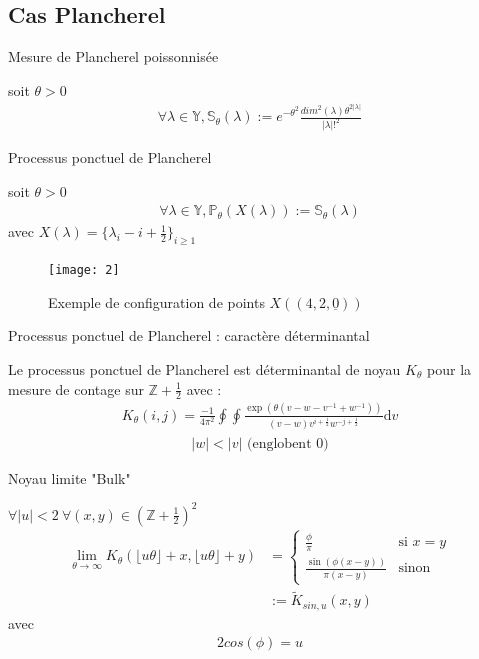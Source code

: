 \documentclass[french]{beamer}
\begin{document}
\subsection{Cas Plancherel}
\begin{frame}{Mesure de Plancherel poissonnisée }
\begin{definition}
soit $\theta>0$
\begin{align*}
\forall \lambda \in \mathbb{Y},  \mathbb{S}_\theta(\lambda):=e^{-\theta^2}\frac{dim^2(\lambda)\theta^{2|\lambda|}}{|\lambda|!^2}
\end{align*}
\end{definition}
\end{frame}
\begin{frame}{Processus ponctuel de Plancherel}

\begin{definition}
soit $\theta>0$
\begin{align*}
\forall \lambda \in \mathbb{Y},  \mathbb{P}_\theta(X(\lambda)):= \mathbb{S}_\theta(\lambda)
\end{align*}
avec $X(\lambda)=\{\lambda_i-i+\frac{1}{2}\}_{i\geq 1}$

\end{definition}
\begin{figure}[ht]
    \centering
  \texttt{[image: 2]}
\caption {Exemple de configuration de points  $X((4,2,\underline{0}))$}
\end{figure}
\end{frame}
\begin{frame}{Processus ponctuel de Plancherel : caractère déterminantal}
\begin{theorem}
Le processus ponctuel de Plancherel est déterminantal de noyau $K_\theta$  pour la mesure de contage sur $\mathbb{Z}+\frac{1}{2}$ avec :
\begin{align*}
K_\theta(i,j)=\frac{-1}{4\pi^2} \oint\oint\frac{\exp(\theta(v-w-v^{-1}+w^{-1}))}{(v-w)v^{i+\frac 1 2} w^{-j+\frac 1 2}}\mathrm{d}v 
\end{align*}
\begin{align*}
|w|<|v| \text{ (englobent 0)} 
\end{align*}
\end{theorem}
  \end{frame}

\begin{frame}{Noyau limite "Bulk"}
\begin{theorem}
$\forall |u| <2  \ \forall (x,y) \in (\mathbb{Z}+\frac{1}{2})^2$ 
\begin{align*}
\lim_{\theta \to \infty} K_\theta(\lfloor u\theta \rfloor +x, \lfloor u\theta \rfloor +y )&=
\left\{\begin{matrix}
\frac{\phi }{\pi}\  &\text{si }  x=y
\\ 
\frac{\sin(\phi(x-y))}{\pi(x-y)} &\text{sinon} 
\end{matrix}\right.
\\ &:=\tilde{K}_{sin,u}(x,y)
\end{align*}
avec
\begin{align*}
 2cos(\phi)=u
\end{align*}
\end{theorem}
\end{frame}
\end{document}
